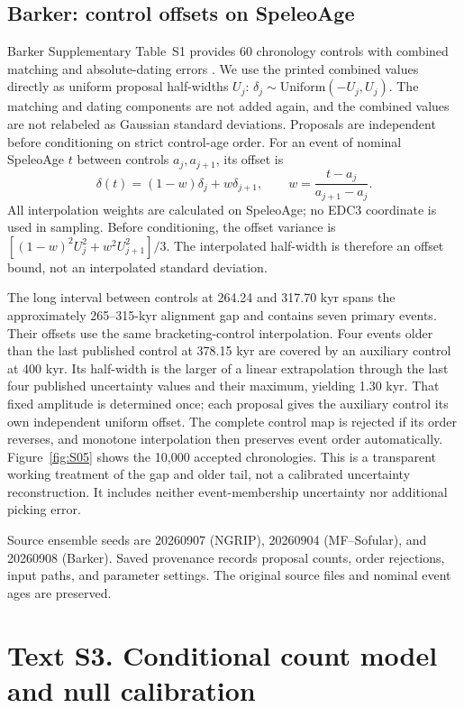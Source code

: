 \documentclass[11pt]{article}
\begin{document}
\subsection*{Barker: control offsets on SpeleoAge}

Barker Supplementary Table~S1 provides 60 chronology controls with combined matching and absolute-dating errors \citep{barker2011800}. We use the printed combined values directly as uniform proposal half-widths $U_j$: $\delta_j\sim\mathrm{Uniform}(-U_j,U_j)$. The matching and dating components are not added again, and the combined values are not relabeled as Gaussian standard deviations. Proposals are independent before conditioning on strict control-age order. For an event of nominal SpeleoAge $t$ between controls $a_j,a_{j+1}$, its offset is
\begin{equation}
 \delta(t)=(1-w)\delta_j+w\delta_{j+1},\qquad
 w=\frac{t-a_j}{a_{j+1}-a_j}.
\end{equation}
All interpolation weights are calculated on SpeleoAge; no EDC3 coordinate is used in sampling. Before conditioning, the offset variance is $[(1-w)^2U_j^2+w^2U_{j+1}^2]/3$. The interpolated half-width is therefore an offset bound, not an interpolated standard deviation.

The long interval between controls at 264.24 and 317.70 kyr spans the approximately 265--315-kyr alignment gap and contains seven primary events. Their offsets use the same bracketing-control interpolation. Four events older than the last published control at 378.15 kyr are covered by an auxiliary control at 400 kyr. Its half-width is the larger of a linear extrapolation through the last four published uncertainty values and their maximum, yielding 1.30 kyr. That fixed amplitude is determined once; each proposal gives the auxiliary control its own independent uniform offset. The complete control map is rejected if its order reverses, and monotone interpolation then preserves event order automatically. Figure~\ref{fig:S05} shows the 10,000 accepted chronologies. This is a transparent working treatment of the gap and older tail, not a calibrated uncertainty reconstruction. It includes neither event-membership uncertainty nor additional picking error.

Source ensemble seeds are 20260907 (NGRIP), 20260904 (MF--Sofular), and 20260908 (Barker). Saved provenance records proposal counts, order rejections, input paths, and parameter settings. The original source files and nominal event ages are preserved.

\section*{Text S3. Conditional count model and null calibration}
\end{document}
